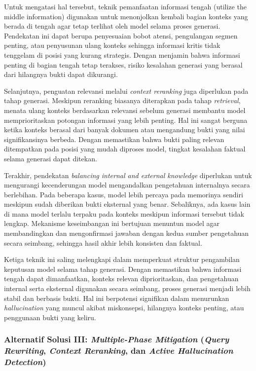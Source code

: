 Untuk mengatasi hal tersebut, teknik pemanfaatan informasi tengah (utilize the middle information) digunakan untuk menonjolkan kembali bagian konteks yang berada di tengah agar tetap terlihat oleh model selama proses generasi. Pendekatan ini dapat berupa penyesuaian bobot atensi, pengulangan segmen penting, atau penyusunan ulang konteks sehingga informasi kritis tidak tenggelam di posisi yang kurang strategis. Dengan menjamin bahwa informasi penting di bagian tengah tetap terakses, risiko kesalahan generasi yang berasal dari hilangnya bukti dapat dikurangi.

Selanjutnya, penguatan relevansi melalui \textit{context reranking} juga diperlukan pada tahap generasi. Meskipun reranking biasanya diterapkan pada tahap \textit{retrieval}, menata ulang konteks berdasarkan relevansi sebelum generasi membantu model memprioritaskan potongan informasi yang lebih penting. Hal ini sangat berguna ketika konteks berasal dari banyak dokumen atau mengandung bukti yang nilai signifikansinya berbeda. Dengan memastikan bahwa bukti paling relevan ditempatkan pada posisi yang mudah diproses model, tingkat kesalahan faktual selama generasi dapat ditekan.

Terakhir, pendekatan \textit{balancing internal and external knowledge} diperlukan untuk mengurangi kecenderungan model mengandalkan pengetahuan internalnya secara berlebihan. Pada beberapa kasus, model lebih percaya pada memorinya sendiri meskipun sudah diberikan bukti eksternal yang benar. Sebaliknya, ada kasus lain di mana model terlalu terpaku pada konteks meskipun informasi tersebut tidak lengkap. Mekanisme keseimbangan ini bertujuan menuntun model agar membandingkan dan mengonfirmasi jawaban dengan kedua sumber pengetahuan secara seimbang, sehingga hasil akhir lebih konsisten dan faktual.

Ketiga teknik ini saling melengkapi dalam memperkuat struktur pengambilan keputusan model selama tahap generasi. Dengan memastikan bahwa informasi tengah dapat dimanfaatkan, konteks relevan diprioritaskan, dan pengetahuan internal serta eksternal digunakan secara seimbang, proses generasi menjadi lebih stabil dan berbasis bukti. Hal ini berpotensi signifikan dalam menurunkan \textit{hallucination} yang muncul akibat miskonsepsi, hilangnya konteks penting, atau penggunaan bukti yang keliru.

\subsubsection{Alternatif Solusi III: \textit{Multiple-Phase Mitigation} (\textit{Query Rewriting}, \textit{Context Reranking}, dan \textit{Active Hallucination Detection})}


